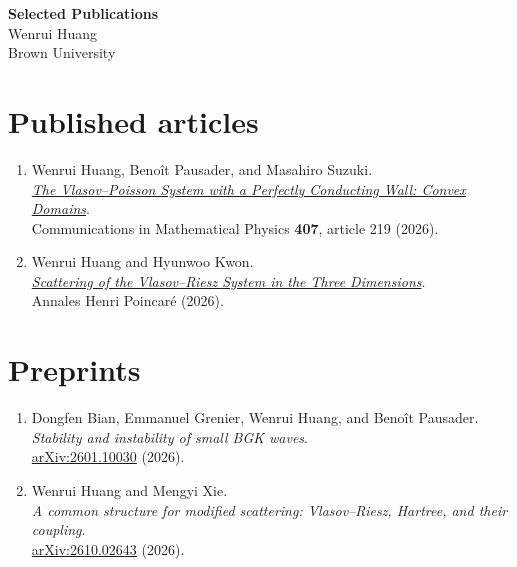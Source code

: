 \documentclass[11pt,letterpaper]{article}
\begin{document}
\begin{center}
  {\Large\bfseries Selected Publications}\\[0.5em]
  {\large Wenrui Huang}\\[0.25em]
  Brown University
\end{center}
\bigskip

\section*{Published articles}
\begin{enumerate}
\item Wenrui Huang, Beno\^it Pausader, and Masahiro Suzuki.\\
  \href{https://doi.org/10.1007/s00220-026-05731-0}{\emph{The Vlasov--Poisson System with a Perfectly Conducting Wall: Convex Domains}}.\\
  Communications in Mathematical Physics \textbf{407}, article 219 (2026).

\item Wenrui Huang and Hyunwoo Kwon.\\
  \href{https://doi.org/10.1007/s00023-026-01735-7}{\emph{Scattering of the Vlasov--Riesz System in the Three Dimensions}}.\\
  Annales Henri Poincar\'e (2026).
\end{enumerate}

\section*{Preprints}
\begin{enumerate}[start=3]
\item Dongfen Bian, Emmanuel Grenier, Wenrui Huang, and Beno\^it Pausader.\\
  \emph{Stability and instability of small BGK waves}.\\
  \href{https://arxiv.org/abs/2601.10030}{arXiv:2601.10030} (2026).

\item Wenrui Huang and Mengyi Xie.\\
  \emph{A common structure for modified scattering: Vlasov--Riesz, Hartree, and their coupling}.\\
  \href{https://arxiv.org/abs/2610.02643}{arXiv:2610.02643} (2026).
\end{enumerate}
\end{document}
